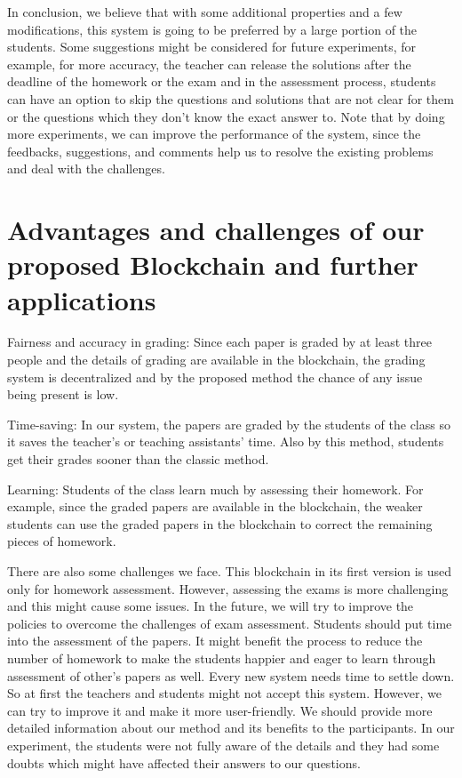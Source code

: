 \documentclass[manuscript,review,anonymous]{acmart}%
\begin{document}
In conclusion, we believe that with some additional properties and a few modifications, this system is going to be preferred by a large portion of the students.
Some suggestions might be considered for future experiments, for example, for more accuracy, the teacher can release the solutions after the deadline of the homework or the exam and in the assessment process, students can have an option to skip the questions and solutions that are not clear for them or the questions which they don't know the exact answer to.
Note that by doing more experiments, we can improve the performance of the system, since the feedbacks, suggestions, and comments help us to resolve the existing problems and deal with the challenges.
\section{Advantages and challenges of our proposed Blockchain and further applications}

Fairness and accuracy in grading: Since each paper is graded by at least three people and the details of grading are available in the blockchain, the grading system is decentralized and by the proposed method the chance of any issue being present is low.

Time-saving: In our system, the papers are graded by the students of the class so it saves the teacher's or teaching assistants' time. Also by this method, students get their grades sooner than the classic method. 

Learning: Students of the class learn much by assessing their homework. For example, since the graded papers are available in the blockchain, the weaker students can use the graded papers in the blockchain to correct the remaining pieces of homework.

There are also some challenges we face. This blockchain in its first version is used only for homework assessment. However, assessing the exams is more challenging and this might cause some issues. In the future, we will try to improve the policies to overcome the challenges of exam assessment.
Students should put time into the assessment of the papers. It might benefit the process to reduce the number of homework to make the students happier and eager to learn through assessment of other's papers as well.
 Every new system needs time to settle down. So at first the teachers and students might not accept this system. However, we can try to improve it and make it more user-friendly. We should provide more detailed information about our method and its benefits to the participants. In our experiment, the students were not fully aware of the details and they had some doubts which might have affected their answers to our questions.
\end{document}

